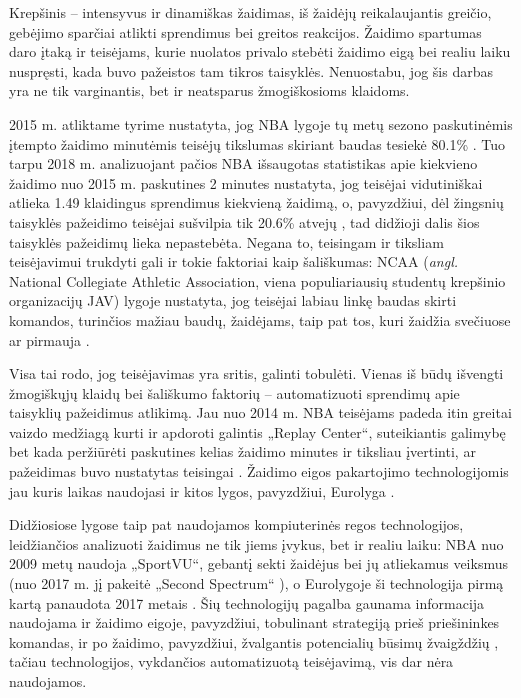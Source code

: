 \documentclass{VUMIFPSbakalaurinis}
\begin{document}
Krepšinis – intensyvus ir dinamiškas žaidimas, iš žaidėjų reikalaujantis greičio, gebėjimo sparčiai atlikti sprendimus bei greitos reakcijos. Žaidimo spartumas daro įtaką ir teisėjams, kurie nuolatos privalo stebėti žaidimo eigą bei realiu laiku nuspręsti, kada buvo pažeistos tam tikros taisyklės. Nenuostabu, jog šis darbas yra ne tik varginantis, bet ir neatsparus žmogiškosioms klaidoms. 

2015 m. atliktame tyrime nustatyta, jog NBA lygoje tų metų sezono paskutinėmis įtempto žaidimo minutėmis teisėjų tikslumas skiriant baudas tesiekė 80.1\% \cite{NBA_bias_Referee}. Tuo tarpu 2018 m. analizuojant pačios NBA išsaugotas statistikas apie kiekvieno žaidimo nuo 2015 m. paskutines 2 minutes nustatyta, jog teisėjai vidutiniškai atlieka 1.49 klaidingus sprendimus kiekvieną žaidimą, o, pavyzdžiui, dėl žingsnių taisyklės pažeidimo teisėjai sušvilpia tik 20.6\% atvejų \cite{SiglerK}, tad didžioji dalis šios taisyklės pažeidimų lieka nepastebėta. Negana to, teisingam ir tiksliam teisėjavimui trukdyti gali ir tokie faktoriai kaip šališkumas: NCAA (\textit{angl.} National Collegiate Athletic Association, viena populiariausių studentų krepšinio organizacijų JAV) lygoje nustatyta, jog teisėjai labiau linkę baudas skirti komandos, turinčios mažiau baudų, žaidėjams, taip pat tos, kuri žaidžia svečiuose ar pirmauja \cite{OfficiatingBias}. 

Visa tai rodo, jog teisėjavimas yra sritis, galinti tobulėti. Vienas iš būdų išvengti žmogiškųjų klaidų bei šališkumo faktorių – automatizuoti sprendimų apie taisyklių pažeidimus atlikimą. Jau nuo 2014 m. NBA teisėjams padeda itin greitai vaizdo medžiagą kurti ir apdoroti galintis „Replay Center“, suteikiantis galimybę bet kada peržiūrėti paskutines kelias žaidimo minutes ir tiksliau įvertinti, ar pažeidimas buvo nustatytas teisingai \cite{NBAReplay}. Žaidimo eigos pakartojimo technologijomis jau kuris laikas naudojasi ir kitos lygos, pavyzdžiui, Eurolyga \cite{EuroleagueReplay}.

Didžiosiose lygose taip pat naudojamos kompiuterinės regos technologijos, leidžiančios analizuoti žaidimus ne tik jiems įvykus, bet ir realiu laiku: NBA nuo 2009 metų naudoja „SportVU“, gebantį sekti žaidėjus bei jų atliekamus veiksmus {\cite{NBAStatsVu}} (nuo 2017 m. jį pakeitė „Second Spectrum“ {\cite{SecondSpectrum})}, o Eurolygoje ši technologija pirmą kartą panaudota 2017 metais {\cite{EuroleagueStats}}. Šių technologijų pagalba gaunama informacija naudojama ir žaidimo eigoje, pavyzdžiui, tobulinant strategiją prieš priešininkes komandas, ir po žaidimo, pavyzdžiui, žvalgantis potencialių būsimų žvaigždžių {\cite{THOMAS20173}}, tačiau technologijos, vykdančios automatizuotą teisėjavimą, vis dar nėra naudojamos.
\end{document}
